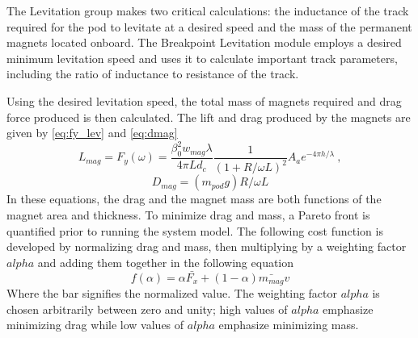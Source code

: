 	The Levitation group makes two critical calculations: the inductance of the
	track required for the pod to levitate at a desired speed and the mass of
	the permanent magnets located onboard. The Breakpoint Levitation module employs a
	desired minimum levitation speed and uses it to calculate important track
	parameters, including the ratio of inductance to resistance of the track.

	Using the desired levitation speed, the total mass of magnets required and
	drag force produced is then calculated. The lift and drag produced
	by the magnets are given by \cref{eq:fy_lev} and \cref{eq:dmag}
	\begin{equation}
		\label{eq:fy_lev}
		L_{mag} = F_{y}(\omega)=\frac{\beta _{0}^{2}w_{mag}\lambda}{4\pi Ld_{c}}\frac{1}{(1+R/\omega L)^{2}}A_ae^{-4\pi h/\lambda } \ ,
	\end{equation}
	\begin{equation}
		\label{eq:dmag}
		D_{mag}=( m_{pod}g)R/\omega L
	\end{equation}
	In these equations, the drag and the magnet mass are both functions of the
	magnet area and thickness. To minimize drag and mass, a Pareto front is
	quantified prior to running the system model. The following cost function
	is developed by normalizing drag and mass, then multiplying by a weighting
	factor $alpha$ and adding them together in the following equation
	\begin{equation}
		\label{eq:pareto}
		f(\alpha ) = \alpha \bar{F_{x}} + (1-\alpha )\bar{m_{mag}}v
	\end{equation}
	Where the bar signifies the normalized value. The weighting factor $alpha$
	is chosen arbitrarily between zero and unity; high values of $alpha$
	emphasize minimizing drag while low values of $alpha$ emphasize minimizing mass.




